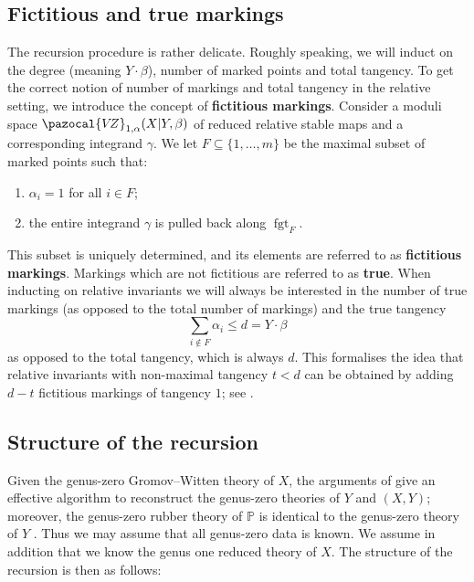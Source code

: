 \documentclass[11pt]{amsart}
\newcommand{\VZ}{\pazocal{V\!Z}}
\newcommand{\fgt}{\operatorname{fgt}}
\theoremstyle{definition}
\theoremstyle{definition}
\begin{document}
\subsection{Fictitious and true markings} The recursion procedure is rather delicate. Roughly speaking, we will induct on the degree (meaning $Y\cdot\beta$), number of marked points and total tangency. To get the correct notion of number of markings and total tangency in  the relative setting, we introduce the concept of \textbf{fictitious markings}. Consider a moduli space $\VZ_{1,\alpha}(X|Y,\beta)$ of reduced relative stable maps and a corresponding integrand $\gamma$. We let $F \subseteq \{1,\ldots,m\}$ be the maximal subset of marked points such that:
\begin{enumerate}
\item $\alpha_i = 1$ for all $i \in F$;
\item the entire integrand $\gamma$ is pulled back along $\fgt_F$.
\end{enumerate}
This subset is uniquely determined, and its elements are referred to as \textbf{fictitious markings}. Markings which are not fictitious are referred to as \textbf{true}. When inducting on relative invariants we will always be interested in the number of true markings (as opposed to the total number of markings) and the true tangency
\begin{equation*} \sum_{i \not\in F} \alpha_i \leq d=Y\cdot \beta \end{equation*}
as opposed to the total tangency, which is always $d$. This formalises the idea that relative invariants with non-maximal tangency $t<d$ can be obtained by adding $d-t$ fictitious markings of tangency $1$; see \cite[Lemma 1.15(i)]{Ga}.

\subsection{Structure of the recursion} Given the genus-zero Gromov--Witten theory of $X$, the arguments of \cite{Ga} give an effective algorithm to reconstruct the genus-zero theories of $Y$ and $(X,Y)$; moreover, the genus-zero rubber theory of $\mathbb{P}$ is identical to the genus-zero theory of $Y$ \cite{GathmannThesis}. Thus we may assume that all genus-zero data is known. We assume in addition that we know the genus one reduced theory of $X$. The structure of the recursion is then as follows:
\end{document}
